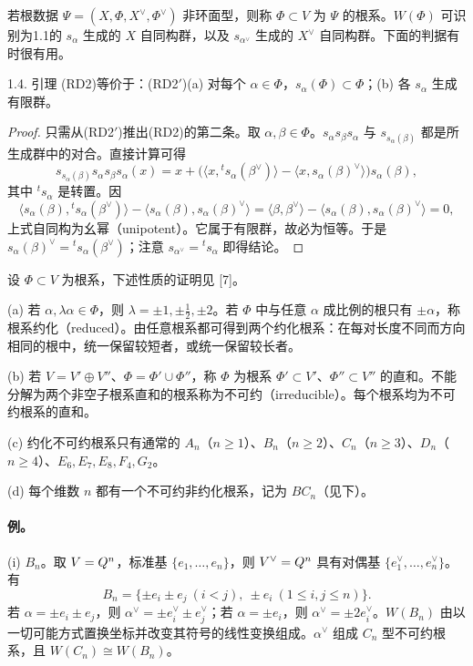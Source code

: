 若根数据 $\Psi=(X,\Phi,X^\vee,\Phi^\vee)$ 非环面型，则称 $\Phi\subset V$ 为 $\Psi$ 的根系。$W(\Phi)$ 可识别为1.1的 $s_\alpha$ 生成的 $X$ 自同构群，以及 $s_{\alpha^\vee}$ 生成的 $X^\vee$ 自同构群。下面的判据有时很有用。
\begin{originaltheorem}{1.4. 引理}
(RD2)等价于：(RD2$'$)(a) 对每个 $\alpha\in\Phi$，$s_\alpha(\Phi)\subset\Phi$；(b) 各 $s_\alpha$ 生成有限群。
\end{originaltheorem}
\begin{proof}
只需从(RD2$'$)推出(RD2)的第二条。取 $\alpha,\beta\in\Phi$。$s_\alpha s_\beta s_\alpha$ 与 $s_{s_\alpha(\beta)}$ 都是所生成群中的对合。直接计算可得
\[
 s_{s_\alpha(\beta)}s_\alpha s_\beta s_\alpha(x)
 =x+\bigl(\langle x,{}^ts_\alpha(\beta^\vee)\rangle
 -\langle x,s_\alpha(\beta)^\vee\rangle\bigr)s_\alpha(\beta),
\]
其中 ${}^ts_\alpha$ 是转置。因
\[
 \langle s_\alpha(\beta),{}^ts_\alpha(\beta^\vee)\rangle
 -\langle s_\alpha(\beta),s_\alpha(\beta)^\vee\rangle
 =\langle\beta,\beta^\vee\rangle-\langle s_\alpha(\beta),s_\alpha(\beta)^\vee\rangle=0,
\]
上式自同构为幺幂（unipotent）。它属于有限群，故必为恒等。于是 $s_\alpha(\beta)^\vee={}^ts_\alpha(\beta^\vee)$；注意 $s_{\alpha^\vee}={}^ts_\alpha$ 即得结论。
\end{proof}
设 $\Phi\subset V$ 为根系，下述性质的证明见 [7]。

(a) 若 $\alpha,\lambda\alpha\in\Phi$，则 $\lambda=\pm1,\pm\tfrac12,\pm2$。若 $\Phi$ 中与任意 $\alpha$ 成比例的根只有 $\pm\alpha$，称根系约化（reduced）。由任意根系都可得到两个约化根系：在每对长度不同而方向相同的根中，统一保留较短者，或统一保留较长者。

(b) 若 $V=V'\oplus V''$、$\Phi=\Phi'\cup\Phi''$，称 $\Phi$ 为根系 $\Phi'\subset V'$、$\Phi''\subset V''$ 的直和。不能分解为两个非空子根系直和的根系称为不可约（irreducible）。每个根系均为不可约根系的直和。

(c) 约化不可约根系只有通常的 $A_n$（$n\ge1$）、$B_n$（$n\ge2$）、$C_n$（$n\ge3$）、$D_n$（$n\ge4$）、$E_6,E_7,E_8,F_4,G_2$。

(d) 每个维数 $n$ 都有一个不可约非约化根系，记为 $BC_n$（见下）。

\paragraph*{例。} (i) $B_n$。取 $V=Q^n$，标准基 $\{e_1,\ldots,e_n\}$，则 $V^\vee=Q^n$ 具有对偶基 $\{e_1^\vee,\ldots,e_n^\vee\}$。有
\[
 B_n=\{\pm e_i\pm e_j\ (i<j),\ \pm e_i\ (1\le i,j\le n)\}.
\]
若 $\alpha=\pm e_i\pm e_j$，则 $\alpha^\vee=\pm e_i^\vee\pm e_j^\vee$；若 $\alpha=\pm e_i$，则 $\alpha^\vee=\pm2e_i^\vee$。$W(B_n)$ 由以一切可能方式置换坐标并改变其符号的线性变换组成。$\alpha^\vee$ 组成 $C_n$ 型不可约根系，且 $W(C_n)\cong W(B_n)$。

